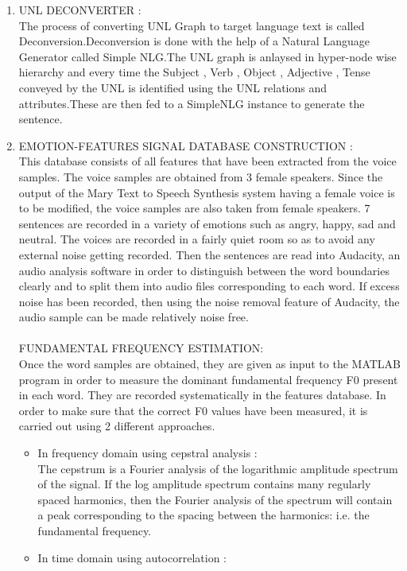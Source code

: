 \documentclass{article}
\begin{document}
\begin{enumerate}
\item UNL DECONVERTER :
\\The process of converting UNL Graph to target language text is called Deconversion.Deconversion is done with the help of a Natural Language Generator called Simple NLG.The UNL graph is anlaysed in hyper-node wise hierarchy and every time the Subject , Verb , Object , Adjective , Tense conveyed by the UNL is identified using the UNL relations and attributes.These are then fed to a SimpleNLG instance to generate the sentence.

\item EMOTION-FEATURES SIGNAL DATABASE CONSTRUCTION :
\\This database consists of all features that have been extracted from the voice samples. The voice samples are obtained from 3 female speakers.  Since the output of the Mary Text to Speech Synthesis system having a female voice is to be modified, the voice samples are also taken from female speakers. 7 sentences are recorded in a variety of emotions such as angry, happy, sad and neutral.  The voices are recorded in a fairly quiet room so as to avoid any external noise getting recorded. Then the sentences are read into Audacity, an audio analysis software in order to distinguish between the word boundaries clearly and to split them into audio files corresponding to each word. If excess noise has been recorded, then using the noise removal feature of Audacity, the audio sample can be made relatively noise free.\\
\\FUNDAMENTAL FREQUENCY ESTIMATION:
\\Once the word samples are obtained, they are given as input to the MATLAB program in order to measure the dominant fundamental frequency F0 present in each word. They are recorded systematically in the features database. In order to make sure that the correct F0 values have been measured, it is carried out using 2 different approaches. 
\begin{itemize}
\item In frequency domain using cepstral analysis :
\\The cepstrum is a Fourier analysis of the logarithmic amplitude spectrum of the signal.  If the log amplitude spectrum contains many regularly spaced harmonics, then the Fourier analysis of the spectrum will contain  a peak corresponding to the spacing between the harmonics: i.e. the fundamental frequency.
\item In time domain using autocorrelation :

\end{itemize}
\end{enumerate}
\end{document}
